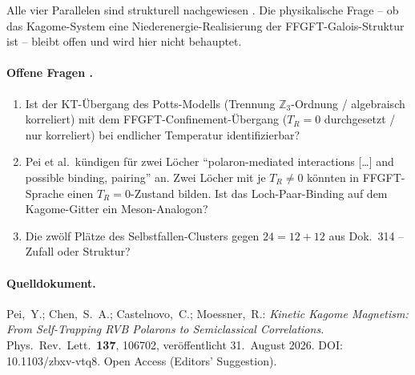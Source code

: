 Alle vier Parallelen sind strukturell nachgewiesen \SM. Die physikalische
Frage -- ob das Kagome-System eine Niederenergie-Realisierung der
FFGFT-Galois-Struktur ist -- bleibt offen und wird hier nicht behauptet.

\paragraph{Offene Fragen \SM.}
\begin{enumerate}
  \item Ist der KT-Übergang des Potts-Modells (Trennung
        $\mathbb{Z}_3$-Ordnung / algebraisch korreliert) mit dem
        FFGFT-Confinement-Übergang ($T_R=0$ durchgesetzt / nur korreliert)
        bei endlicher Temperatur identifizierbar?
  \item Pei et al.\ kündigen für zwei Löcher \enquote{polaron-mediated
        interactions [\ldots] and possible binding, pairing} an. Zwei Löcher
        mit je $T_R\neq0$ könnten in FFGFT-Sprache einen $T_R=0$-Zustand bilden.
        Ist das Loch-Paar-Binding auf dem Kagome-Gitter ein Meson-Analogon?
  \item Die zwölf Plätze des Selbstfallen-Clusters gegen $24=12+12$ aus
        Dok.~314 -- Zufall oder Struktur?
\end{enumerate}

\paragraph{Quelldokument.} Pei,~Y.; Chen,~S.~A.; Castelnovo,~C.;
Moessner,~R.: \textit{Kinetic Kagome Magnetism: From Self-Trapping RVB
Polarons to Semiclassical Correlations.}
Phys.~Rev.~Lett.~\textbf{137}, 106702, veröffentlicht 31.~August 2026.
DOI: 10.1103/zbxv-vtq8. Open Access (Editors' Suggestion).
